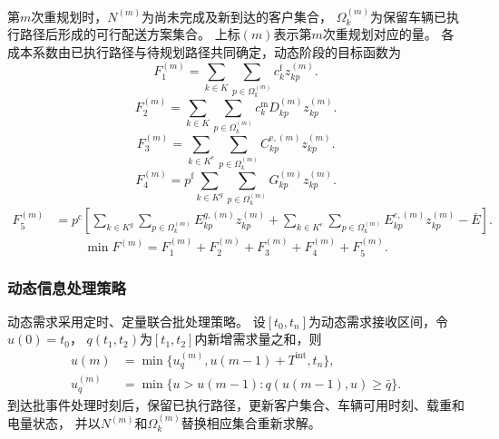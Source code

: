 第$m$次重规划时，$N^{(m)}$为尚未完成及新到达的客户集合，
$\Omega_k^{(m)}$为保留车辆已执行路径后形成的可行配送方案集合。
上标$(m)$表示第$m$次重规划对应的量。
各成本系数由已执行路径与待规划路径共同确定，动态阶段的目标函数为\cite{ref:71}
\begin{equation}
F_1^{(m)}
=\sum_{k\in K}\sum_{p\in\Omega_k^{(m)}}c_k^{\mathrm f}z_{kp}^{(m)}.
\label{eq:unified-dynamic-f1}
\end{equation}
\begin{equation}
F_2^{(m)}
=\sum_{k\in K}\sum_{p\in\Omega_k^{(m)}}c_k^{\mathrm m}D_{kp}^{(m)}z_{kp}^{(m)}.
\label{eq:unified-dynamic-f2}
\end{equation}
\begin{equation}
F_3^{(m)}
=\sum_{k\in K^{e}}\sum_{p\in\Omega_k^{(m)}}C_{kp}^{\mathrm e,(m)}z_{kp}^{(m)}.
\label{eq:unified-dynamic-f3}
\end{equation}
\begin{equation}
F_4^{(m)}
=p^{\mathrm f}\sum_{k\in K^{g}}\sum_{p\in\Omega_k^{(m)}}G_{kp}^{(m)}z_{kp}^{(m)}.
\label{eq:unified-dynamic-f4}
\end{equation}
\begin{equation}
\begin{aligned}
F_5^{(m)}
&=p^{\mathrm c}\left[
\sum_{k\in K^{g}}\sum_{p\in\Omega_k^{(m)}}E_{kp}^{g,(m)}z_{kp}^{(m)}
+\sum_{k\in K^{e}}\sum_{p\in\Omega_k^{(m)}}E_{kp}^{e,(m)}z_{kp}^{(m)}
-\overline E
\right].
\end{aligned}
\label{eq:unified-dynamic-f5}
\end{equation}
\begin{equation}
\min F^{(m)}
=F_1^{(m)}+F_2^{(m)}+F_3^{(m)}+F_4^{(m)}+F_5^{(m)}.
\label{eq:unified-dynamic-objective}
\end{equation}

\subsubsection{动态信息处理策略}

动态需求采用定时、定量联合批处理策略\cite{ref:71}。
设$[t_0,t_n]$为动态需求接收区间，令$u(0)=t_0$，
$q(t_1,t_2)$为$[t_1,t_2]$内新增需求量之和，则
\begin{align}
u(m)
&=\min\{u_q^{(m)},u(m-1)+T^{\mathrm{int}},t_n\},
\label{eq:unified-trigger-time}\\
u_q^{(m)}
&=\min\{u>u(m-1):q(u(m-1),u)\ge\bar q\}.
\label{eq:unified-trigger-quantity}
\end{align}
到达批事件处理时刻后，保留已执行路径，更新客户集合、车辆可用时刻、载重和电量状态，
并以$N^{(m)}$和$\Omega_k^{(m)}$替换相应集合重新求解。
